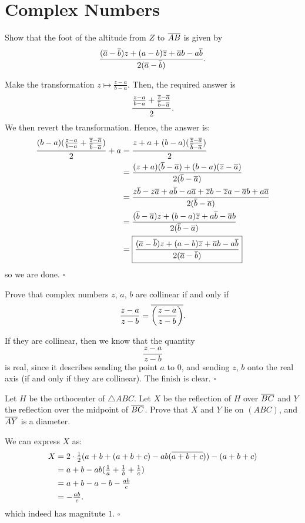 \documentclass{article}
\begin{document}
\newpage

\section{Complex Numbers}
\begin{problem}[6.3]{}
Show that the foot of the altitude from $Z$ to $\overline{AB}$ is given by \[\dfrac{(\overline{a}-\overline{b})z+(a-b)\overline{z}+\overline{a}b-a\overline{b}}{2(\overline{a}-\overline{b})}.\]
\end{problem}

Make the transformation $z \mapsto \tfrac{z-a}{b-a}$. Then, the required answer is \[\dfrac{\tfrac{z-a}{b-a} + \tfrac{\overline{z}-\overline{a}}{\overline{b}-\overline{a}}}{2}.\] We then revert the transformation. Hence, the answer is:
\begin{align*}
\dfrac{(b-a)(\tfrac{z-a}{b-a} + \tfrac{\overline{z}-\overline{a}}{\overline{b}-\overline{a}})}{2}+a &= \dfrac{z+a+(b-a)(\tfrac{\overline{z}-\overline{a}}{\overline{b}-\overline{a}})}{2} \\
&= \dfrac{(z+a)(\overline{b}-\overline{a})+(b-a)(\overline{z}-\overline{a})}{2(\overline{b}-\overline{a})} \\
&= \dfrac{z\overline{b}-z\overline{a}+a\overline{b}-a\overline{a}+\overline{z}b-\overline{z}a-\overline{a}b+a\overline{a}}{2(\overline{b}-\overline{a})} \\
&= \dfrac{(\overline{b}-\overline{a})z+(b-a)\overline{z}+a\overline{b}-\overline{a}b}{2(\overline{b}-\overline{a})} \\
&= \boxed{\dfrac{(\overline{a}-\overline{b})z+(a-b)\overline{z}+\overline{a}b-a\overline{b}}{2(\overline{a}-\overline{b})}} \\
\end{align*}
so we are done. $\square$

\begin{problem}[6.8]{}
Prove that complex numbers $z$, $a$, $b$ are collinear if and only if \[\dfrac{z - a}{z - b} = \overline{\left(\dfrac{z - a}{z - b}\right)}.\]
\end{problem}

If they are collinear, then we know that the quantity \[\dfrac{z-a}{z-b}\] is real, since it describes sending the point $a$ to $0$, and sending $z$, $b$ onto the real axis (if and only if they are collinear). The finish is clear. $\square$

\begin{problem}[6.14]{}
Let $H$ be the orthocenter of $\triangle ABC$. Let $X$ be the reflection of $H$ over $\overline{BC}$ and $Y$ the reflection over the midpoint of $\overline{BC}$. Prove that $X$ and $Y$ lie on $(ABC)$, and $\overline{AY}$ is a diameter.
\end{problem}

We can express $X$ as: 
\begin{align*}
X &= 2\cdot \tfrac{1}{2}(a+b+(a+b+c)-ab(\overline{a+b+c}))-(a+b+c) \\
&= a+b-ab(\tfrac{1}{a}+\tfrac{1}{b}+\tfrac{1}{c}) \\
&= a+b-a-b-\tfrac{ab}{c} \\
&= -\tfrac{ab}{c}.
\end{align*}
which indeed has magnitute $1$. $\square$
\end{document}
